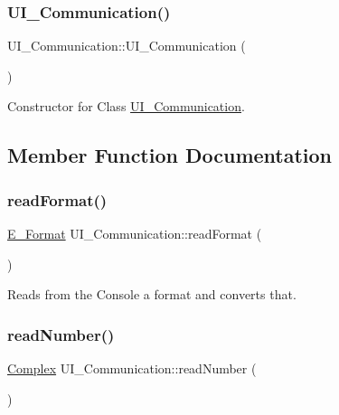 \subsubsection{\texorpdfstring{U\+I\+\_\+\+Communication()}{UI\_Communication()}}
{\footnotesize\ttfamily U\+I\+\_\+\+Communication\+::\+U\+I\+\_\+\+Communication (\begin{DoxyParamCaption}{ }\end{DoxyParamCaption})}



Constructor for Class \mbox{\hyperlink{class_u_i___communication}{U\+I\+\_\+\+Communication}}. 



\subsection{Member Function Documentation}
\mbox{\label{class_u_i___communication_a05dcd3ca7e560c0e09b1174ca7e8d727}} 
\subsubsection{\texorpdfstring{read\+Format()}{readFormat()}}
{\footnotesize\ttfamily \mbox{\hyperlink{_complex_8h_adaa0992033b28ba1421a05c029ffa82e}{E\+\_\+\+Format}} U\+I\+\_\+\+Communication\+::read\+Format (\begin{DoxyParamCaption}{ }\end{DoxyParamCaption})}



Reads from the Console a format and converts that. 

\mbox{\label{class_u_i___communication_ab148ad16ca061fc9235f5950ec0aff85}} 
\subsubsection{\texorpdfstring{read\+Number()}{readNumber()}}
{\footnotesize\ttfamily \mbox{\hyperlink{class_complex}{Complex}} U\+I\+\_\+\+Communication\+::read\+Number (\begin{DoxyParamCaption}{ }\end{DoxyParamCaption})}



